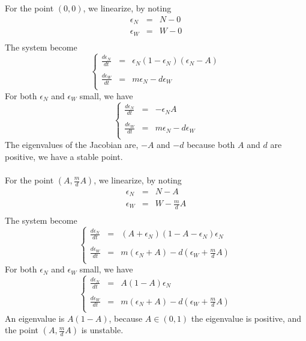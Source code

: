 \documentclass{article}
\begin{document}
For the point $(0,0)$, we linearize, by noting 
\[
\begin{array}{rcl}
\epsilon_N & = & N - 0 \\
\epsilon_W & = & W - 0 \\
\end{array}
\]
The system become
\[
\left\lbrace
\begin{array}{rcl}
\frac{d\epsilon_N}{dt} & = & \epsilon_N(1-\epsilon_N)(\epsilon_N-A) \\
\\
\frac{d\epsilon_W}{dt} & = & m\epsilon_N -d\epsilon_W \\
\end{array}
\right.
\]
For both $\epsilon_N$ and $\epsilon_W$ small, we have
\[
\left\lbrace
\begin{array}{rcl}
\frac{d\epsilon_N}{dt} & = & -\epsilon_N A \\
\\
\frac{d\epsilon_W}{dt} & = & m\epsilon_N -d\epsilon_W \\
\end{array}
\right.
\]
The eigenvalues of the Jacobian are, $-A$ and $-d$ because both $A$ and $d$ are positive, we have a stable point.
\\
\\
For the point $(A,\frac{m}{d}A)$, we linearize, by noting 
\[
\begin{array}{rcl}
\epsilon_N & = & N - A \\
\epsilon_W & = & W - \frac{m}{d}A \\
\end{array}
\]
The system become
\[
\left\lbrace
\begin{array}{rcl}
\frac{d\epsilon_N}{dt} & = & (A+\epsilon_N)(1-A-\epsilon_N)\epsilon_N \\
\\
\frac{d\epsilon_W}{dt} & = & m(\epsilon_N+A) -d(\epsilon_W+\frac{m}{d}A) \\
\end{array}
\right.
\]
For both $\epsilon_N$ and $\epsilon_W$ small, we have
\[
\left\lbrace
\begin{array}{rcl}
\frac{d\epsilon_N}{dt} & = & A(1-A)\epsilon_N \\
\\
\frac{d\epsilon_W}{dt} & = & m(\epsilon_N+A) -d(\epsilon_W+\frac{m}{d}A) \\
\end{array}
\right.
\]
An eigenvalue is $A(1-A)$, because $A\in(0,1)$ the eigenvalue is positive, and the point $(A,\frac{m}{d}A)$ is unstable.
\end{document}
